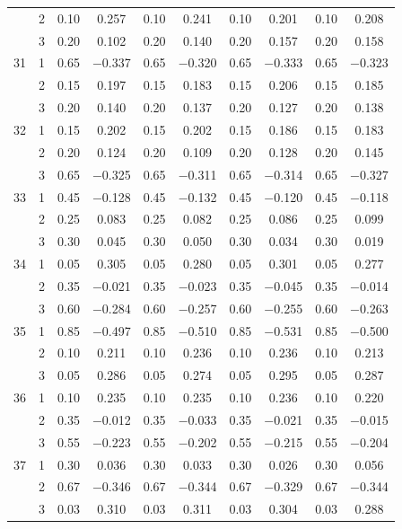\begin{longtable}{llcccccccc}
   & 2 & 0.10 & 0.257 & 0.10 & 0.241 & 0.10 & 0.201 & 0.10 & 0.208 \\ 
   & 3 & 0.20 & 0.102 & 0.20 & 0.140 & 0.20 & 0.157 & 0.20 & 0.158 \\ 
  31 & 1 & 0.65 & $-$0.337 & 0.65 & $-$0.320 & 0.65 & $-$0.333 & 0.65 & $-$0.323 \\ 
   & 2 & 0.15 & 0.197 & 0.15 & 0.183 & 0.15 & 0.206 & 0.15 & 0.185 \\ 
   & 3 & 0.20 & 0.140 & 0.20 & 0.137 & 0.20 & 0.127 & 0.20 & 0.138 \\ 
  32 & 1 & 0.15 & 0.202 & 0.15 & 0.202 & 0.15 & 0.186 & 0.15 & 0.183 \\ 
   & 2 & 0.20 & 0.124 & 0.20 & 0.109 & 0.20 & 0.128 & 0.20 & 0.145 \\ 
   & 3 & 0.65 & $-$0.325 & 0.65 & $-$0.311 & 0.65 & $-$0.314 & 0.65 & $-$0.327 \\ 
  33 & 1 & 0.45 & $-$0.128 & 0.45 & $-$0.132 & 0.45 & $-$0.120 & 0.45 & $-$0.118 \\ 
   & 2 & 0.25 & 0.083 & 0.25 & 0.082 & 0.25 & 0.086 & 0.25 & 0.099 \\ 
   & 3 & 0.30 & 0.045 & 0.30 & 0.050 & 0.30 & 0.034 & 0.30 & 0.019 \\ 
  34 & 1 & 0.05 & 0.305 & 0.05 & 0.280 & 0.05 & 0.301 & 0.05 & 0.277 \\ 
   & 2 & 0.35 & $-$0.021 & 0.35 & $-$0.023 & 0.35 & $-$0.045 & 0.35 & $-$0.014 \\ 
   & 3 & 0.60 & $-$0.284 & 0.60 & $-$0.257 & 0.60 & $-$0.255 & 0.60 & $-$0.263 \\ 
  35 & 1 & 0.85 & $-$0.497 & 0.85 & $-$0.510 & 0.85 & $-$0.531 & 0.85 & $-$0.500 \\ 
   & 2 & 0.10 & 0.211 & 0.10 & 0.236 & 0.10 & 0.236 & 0.10 & 0.213 \\ 
   & 3 & 0.05 & 0.286 & 0.05 & 0.274 & 0.05 & 0.295 & 0.05 & 0.287 \\ 
  36 & 1 & 0.10 & 0.235 & 0.10 & 0.235 & 0.10 & 0.236 & 0.10 & 0.220 \\ 
   & 2 & 0.35 & $-$0.012 & 0.35 & $-$0.033 & 0.35 & $-$0.021 & 0.35 & $-$0.015 \\ 
   & 3 & 0.55 & $-$0.223 & 0.55 & $-$0.202 & 0.55 & $-$0.215 & 0.55 & $-$0.204 \\ 
  37 & 1 & 0.30 & 0.036 & 0.30 & 0.033 & 0.30 & 0.026 & 0.30 & 0.056 \\ 
   & 2 & 0.67 & $-$0.346 & 0.67 & $-$0.344 & 0.67 & $-$0.329 & 0.67 & $-$0.344 \\ 
   & 3 & 0.03 & 0.310 & 0.03 & 0.311 & 0.03 & 0.304 & 0.03 & 0.288 \\ 

\end{longtable}
